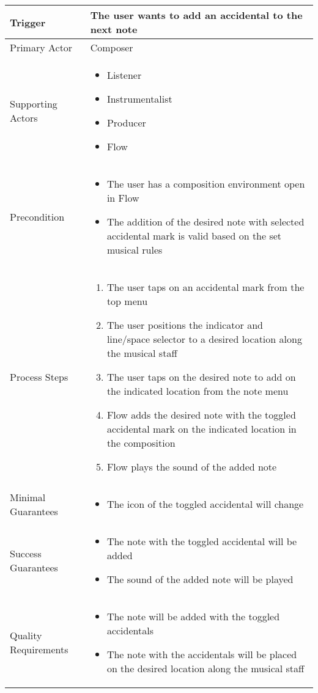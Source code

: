 \begin{tabularx}{\textwidth}{|X|X|}
\hline
Trigger & 
The user wants to add an accidental to the next note \\
\hline
Primary Actor & 
Composer \\
\hline
Supporting Actors & 
\begin{itemize}
\item Listener
\item Instrumentalist
\item Producer
\item Flow
\end{itemize} \\
\hline
Precondition & 
\begin{itemize}
\item The user has a composition environment open in Flow
\item The addition of the desired note with selected accidental mark is valid based on the set musical rules
\end{itemize} \\
\hline
Process Steps & 
\begin{enumerate}
\item The user taps on an accidental mark from the top menu
\item The user positions the indicator and line/space selector to a desired location along the musical staff
\item The user taps on the desired note to add on the indicated location from the note menu
\item Flow adds the desired note with the toggled accidental mark on the indicated location in the composition
\item Flow plays the sound of the added note
\end{enumerate} \\
\hline
Minimal Guarantees & 
\begin{itemize}
  \item The icon of the toggled accidental will change
\end{itemize} \\
\hline
Success Guarantees & 
\begin{itemize}
  \item The note with the toggled accidental will be added
  \item The sound of the added note will be played
\end{itemize} \\
\hline
Quality Requirements & 
\begin{itemize}
\item The note will be added with the toggled accidentals
\item The note with the accidentals will be placed on the desired location along the musical staff
\end{itemize} \\ 
\hline
\end{tabularx}

